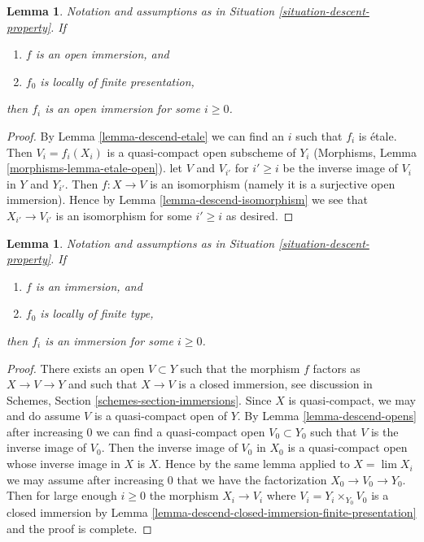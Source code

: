 \documentclass{stacks-project}
\theoremstyle{plain}
\newtheorem{lemma}[subsection]{Lemma}
\theoremstyle{definition}
\theoremstyle{remark}
\numberwithin{equation}{subsection}
\def\lim{\mathop{\mathrm{lim}}\nolimits}
\begin{document}
\begin{lemma}
\label{lemma-descend-open-immersion}
Notation and assumptions as in Situation \ref{situation-descent-property}.
If
\begin{enumerate}
\item $f$ is an open immersion, and
\item $f_0$ is locally of finite presentation,
\end{enumerate}
then $f_i$ is an open immersion for some $i \geq 0$.
\end{lemma}

\begin{proof}
By Lemma \ref{lemma-descend-etale} we can find an $i$ such that $f_i$
is \'etale. Then $V_i = f_i(X_i)$ is a quasi-compact open subscheme
of $Y_i$ (Morphisms, Lemma \ref{morphisms-lemma-etale-open}).
let $V$ and $V_{i'}$ for $i' \geq i$ be the inverse image of $V_i$
in $Y$ and $Y_{i'}$. Then $f : X \to V$ is an isomorphism
(namely it is a surjective open immersion). Hence by
Lemma \ref{lemma-descend-isomorphism} we see that
$X_{i'} \to V_{i'}$ is an isomorphism
for some $i' \geq i$ as desired.
\end{proof}

\begin{lemma}
\label{lemma-descend-immersion}
Notation and assumptions as in Situation \ref{situation-descent-property}.
If
\begin{enumerate}
\item $f$ is an immersion, and
\item $f_0$ is locally of finite type,
\end{enumerate}
then $f_i$ is an immersion for some $i \geq 0$.
\end{lemma}

\begin{proof}
There exists an open $V \subset Y$ such that the morphism
$f$ factors as $X \to V \to Y$ and such that $X \to V$ is
a closed immersion, see discussion in
Schemes, Section \ref{schemes-section-immersions}.
Since $X$ is quasi-compact, we may and do assume $V$ is a quasi-compact open
of $Y$. By Lemma \ref{lemma-descend-opens} after increasing $0$
we can find a quasi-compact open $V_0 \subset Y_0$ such that
$V$ is the inverse image of $V_0$. Then the inverse image of
$V_0$ in $X_0$ is a quasi-compact open whose inverse image in $X$ is $X$.
Hence by the same lemma applied to $X = \lim X_i$ we may
assume after increasing $0$ that we have the factorization
$X_0 \to V_0 \to Y_0$. Then for large enough $i \geq 0$ the morphism
$X_i \to V_i$ where $V_i = Y_i \times_{Y_0} V_0$ is a closed immersion by
Lemma \ref{lemma-descend-closed-immersion-finite-presentation}
and the proof is complete.
\end{proof}
\end{document}

